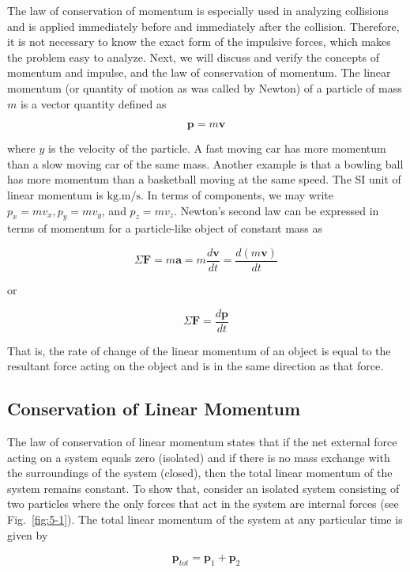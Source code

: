 \documentclass[10pt]{article}
\numberwithin{equation}{section}
\begin{document}
The law of conservation of momentum is especially used in analyzing collisions and is applied immediately before and immediately after the collision. Therefore, it is not necessary to know the exact form of the impulsive forces, which makes the problem easy to analyze. Next, we will discuss and verify the concepts of momentum and impulse, and the law of conservation of momentum. The linear momentum (or quantity of motion as was called by Newton) of a particle of mass $m$ is a vector quantity defined as

$$
\mathbf{p}=m \mathbf{v}
$$

where $y$ is the velocity of the particle. A fast moving car has more momentum than a slow moving car of the same mass. Another example is that a bowling ball has more momentum than a basketball moving at the same speed. The SI unit of linear momentum is $\mathrm{kg} . \mathrm{m} / \mathrm{s}$. In terms of components, we may write $p_{x}=m v_{x}, p_{y}=m v_{y}$, and $p_{z}=m v_{z}$. Newton's second law can be expressed in terms of momentum for a particle-like object of constant mass as

$$
\Sigma \mathbf{F}=m \mathbf{a}=m \frac{d \mathbf{v}}{d t}=\frac{d(m \mathbf{v})}{d t}
$$

or

$$
\Sigma \mathbf{F}=\frac{d \mathbf{p}}{d t}
$$

That is, the rate of change of the linear momentum of an object is equal to the resultant force acting on the object and is in the same direction as that force.

\subsection{Conservation of Linear Momentum}\label{sec:5-2}
The law of conservation of linear momentum states that if the net external force acting on a system equals zero (isolated) and if there is no mass exchange with the surroundings of the system (closed), then the total linear momentum of the system remains constant. To show that, consider an isolated system consisting of two particles where the only forces that act in the system are internal forces (see Fig.~\ref{fig:5-1}). The total linear momentum of the system at any particular time is given by


\begin{equation}
\mathbf{p}_{t o t}=\mathbf{p}_{1}+\mathbf{p}_{2} \label{eq:5-1}
\end{equation}
\end{document}
